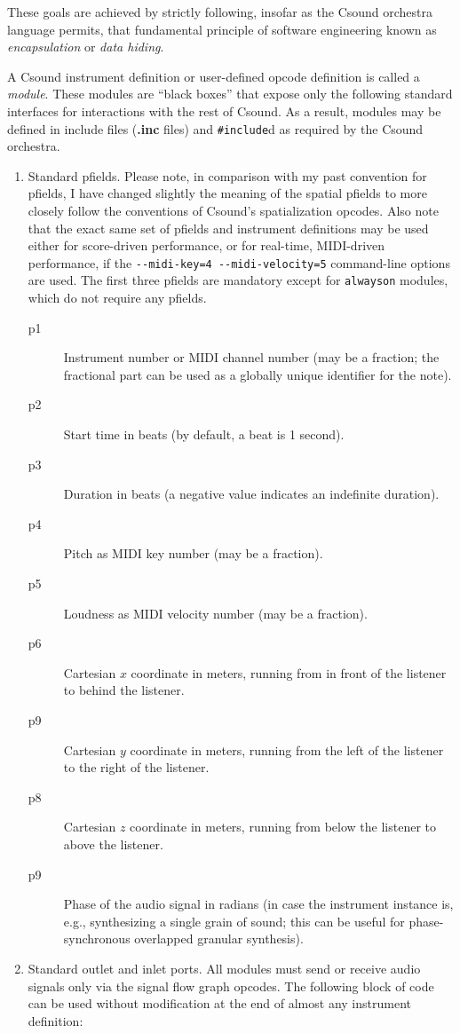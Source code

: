 \documentclass[12pt,letterpaper,onecolumn]{scrartcl}
\begin{document}
\noindent These goals are achieved by strictly following, insofar as the Csound orchestra language permits, that fundamental principle of software engineering known as \emph{encapsulation} or \emph{data hiding}. 

A Csound instrument definition or user-defined opcode definition is called a \emph{module}. These modules are ``black boxes'' that expose only the following standard interfaces for interactions with the rest of Csound. As a result, modules may be defined in include files (\textbf{.inc} files) and \texttt{\#include}d as required by the Csound orchestra.

\begin{enumerate}
	\item Standard pfields. Please note, in comparison with my past convention for pfields, I have changed slightly the meaning of the spatial pfields to more closely follow the conventions of Csound's spatialization opcodes. Also note that the exact same set of pfields and instrument definitions may be used either for score-driven performance, or for real-time, MIDI-driven performance, if the \texttt{-\--midi-key=4 -\--midi-velocity=5} command-line options are used. The first three pfields are mandatory except for \texttt{alwayson} modules, which do not require any pfields.
        \begin{description}
			\item[p1]	Instrument number or MIDI channel number (may be a fraction; the fractional part can be used as a globally unique identifier for the note).
			\item[p2] 	Start time in beats (by default, a beat is 1 second).
			\item[p3] 	Duration in beats (a negative value indicates an indefinite duration).
			\item[p4] 	Pitch as MIDI key number (may be a fraction).
			\item[p5] 	Loudness as MIDI velocity number (may be a fraction).
			\item[p6] 	Cartesian $x$ coordinate in meters, running from in front of the listener to behind the listener.
			\item[p9] 	Cartesian $y$ coordinate in meters, running from the left of the listener to the right of the listener.
			\item[p8] 	Cartesian $z$ coordinate in meters, running from below the listener to above the listener.
			\item[p9] 	Phase of the audio signal in radians (in case the instrument instance is, e.g., synthesizing a single grain of sound; this can be useful for phase-synchronous overlapped granular synthesis).
        \end{description}
	\item Standard outlet and inlet ports. All modules must send or receive audio signals only via the signal flow graph opcodes. The following block of code can be used without modification at the end of almost any instrument definition:
	

\end{enumerate}
\end{document}
